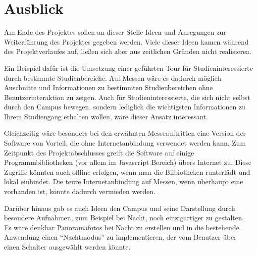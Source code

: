 \section{Ausblick}
\label{sec:Ausblick}

Am Ende des Projektes sollen an dieser Stelle Ideen und Anregungen zur Weiterführung des Projektes gegeben werden. Viele dieser Ideen kamen während des Projektverlaufes auf, ließen sich aber aus zeitlichen Gründen nicht realisieren.

Ein Beispiel dafür ist die Umsetzung einer geführten Tour für Studieninteressierte durch bestimmte Studienbereiche. Auf Messen wäre es dadurch möglich Auschnitte und Informationen zu bestimmten Studienbereichen ohne Benutzerinteraktion zu zeigen. Auch für Studieninteressierte, die sich nicht selbst durch den Campus bewegen, sondern lediglich die wichtigsten Informationen zu Ihrem Studiengang erhalten wollen, wäre dieser Ansatz interessant.

Gleichzeitig wäre besonders bei den erwähnten Messeauftritten eine Version der Software von Vorteil, die ohne Internetanbindung verwendet werden kann. Zum Zeitpunkt des Projektabschlusses greift die Software auf einige Programmbibliotheken (vor allem im Javascript Bereich) übers Internet zu. Diese Zugriffe könnten auch offline erfolgen, wenn man die Bilbiotheken runterlädt und lokal einbindet. Die teure Internetanbindung auf Messen, wenn überhaupt eine vorhanden ist, könnte dadurch vermieden werden.

Darüber hinaus gab es auch Ideen den Campus und seine Darstellung durch besondere Aufnahmen, zum Beispiel bei Nacht, noch einzigartiger zu gestalten. Es wäre denkbar Panoramafotos bei Nacht zu erstellen und in die bestehende Anwendung einen "`Nachtmodus"' zu implementieren, der vom Benutzer über einen Schalter ausgewählt werden könnte.